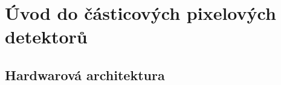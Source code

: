 

\chapter{Úvod do částicových pixelových detektorů}\label{chap:detectors}

\section{Hardwarová architektura}
